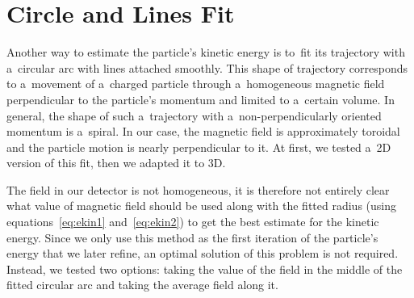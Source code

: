 	\section{Circle and Lines Fit}
	\label{sec:clines}
		Another way to estimate the particle's kinetic energy is to~fit its trajectory with a~circular arc with lines attached smoothly. This shape of trajectory corresponds to a~movement of a~charged particle through a~homogeneous magnetic field perpendicular to the particle's momentum and limited to a~certain volume. In general, the shape of such a~trajectory with a~non-perpendicularly oriented momentum is a~spiral. In our case, the magnetic field is approximately toroidal and the particle motion is nearly perpendicular to it. At first, we tested a~2D version of this fit, then we adapted it to 3D.
		
		The field in our detector is not homogeneous, it is therefore not entirely clear what value of magnetic field should be used along with the fitted radius (using equations~\ref{eq:ekin1} and~\ref{eq:ekin2}) to get the best estimate for the kinetic energy. Since we only use this method as the first iteration of the particle's energy that we later refine, an optimal solution of this problem is not required. Instead, we tested two options: taking the value of the field in the middle of the fitted circular arc and taking the average field along it.
		
